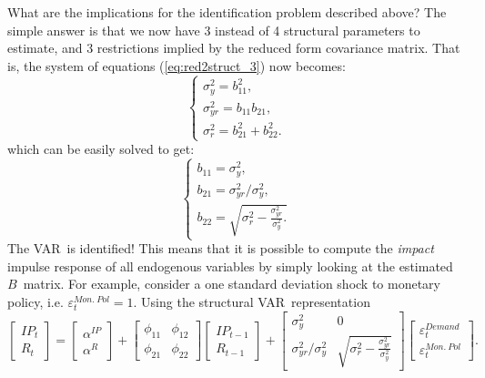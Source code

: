 \documentclass[10pt]{article}
\begin{document}
What are the implications for the identification problem described above?
The simple answer is that we now have 3 instead of 4 structural parameters
to estimate, and 3 restrictions implied by the reduced form covariance
matrix. That is, the system of equations (\ref{eq:red2struct_3}) now becomes:%
\begin{equation}
\left\{
\begin{array}{l}
\sigma _{y}^{2}=b_{11}^{2}, \\
\sigma _{yr}^{2}=b_{11}b_{21}, \\
\sigma _{r}^{2}=b_{21}^{2}+b_{22}^{2}.%
\end{array}%
\right.   \label{eq:red2struct_4}
\end{equation}%
which can be easily solved to get:%
\begin{equation*}
\left\{
\begin{array}{c}
b_{11}=\sigma _{y}^{2}, \\
b_{21}=\sigma _{yr}^{2}/\sigma _{y}^{2}, \\
b_{22}=\sqrt{\sigma _{r}^{2}-\frac{\sigma _{yr}^{2}}{\sigma _{y}^{2}}.}%
\end{array}%
\right.
\end{equation*}%
The VAR\ is identified! This means that it is possible to compute the \emph{%
impact} impulse response of all endogenous variables by simply looking at
the estimated $B$\ matrix. For example, consider a one standard deviation
shock to monetary policy, i.e. $\varepsilon _{t}^{Mon.\ Pol}=1$. Using the
structural VAR\ representation
\begin{equation*}
\begin{bmatrix}
IP_{t} \\
R_{t}%
\end{bmatrix}%
=%
\begin{bmatrix}
\alpha ^{IP} \\
\alpha ^{R}%
\end{bmatrix}%
+\left[
\begin{array}{cc}
\phi _{11} & \phi _{12} \\
\phi _{21} & \phi _{22}%
\end{array}%
\right]
\begin{bmatrix}
IP_{t-1} \\
R_{t-1}%
\end{bmatrix}%
+\left[
\begin{array}{cc}
\sigma _{y}^{2} & 0 \\
\sigma _{yr}^{2}/\sigma _{y}^{2} & \sqrt{\sigma _{r}^{2}-\frac{\sigma
_{yr}^{2}}{\sigma _{y}^{2}}}%
\end{array}%
\right]
\begin{bmatrix}
\varepsilon _{t}^{Demand} \\
\varepsilon _{t}^{Mon.\ Pol}%
\end{bmatrix}%
.
\end{equation*}%
\end{document}
